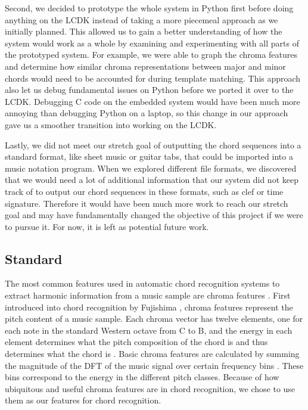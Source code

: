\documentclass[journal]{IEEEtran}
\begin{document}
Second, we decided to prototype the whole system in Python first before doing anything on the LCDK instead of taking a more piecemeal approach as we initially planned.
This allowed us to gain a better understanding of how the system would work as a whole by examining and experimenting with all parts of the prototyped system.
For example, we were able to graph the chroma features and determine how similar chroma representations between major and minor chords would need to be accounted for during template matching.
This approach also let us debug fundamental issues on Python before we ported it over to the LCDK.
Debugging C code on the embedded system would have been much more annoying than debugging Python on a laptop, so this change in our approach gave us a smoother transition into working on the LCDK.

Lastly, we did not meet our stretch goal of outputting the chord sequences into a standard format, like sheet music or guitar tabs, that could be imported into a music notation program.
When we explored different file formats, we discovered that we would need a lot of additional information that our system did not keep track of to output our chord sequences in these formats, such as clef or time signature.
Therefore it would have been much more work to reach our stretch goal and may have fundamentally changed the objective of this project if we were to pursue it.
For now, it is left as potential future work.


\subsection{Standard}
The most common features used in automatic chord recognition systems to extract harmonic information from a music sample are chroma features \cite{cho_chroma}.
First introduced into chord recognition by Fujishima \cite{fujishima}, chroma features represent the pitch content of a music sample.
Each chroma vector has twelve elements, one for each note in the standard Western octave from C to B, and the energy in each element determines what the pitch composition of the chord is and thus determines what the chord is \cite{jiang}.
Basic chroma features are calculated by summing the magnitude of the DFT of the music signal over certain frequency bins \cite{fujishima}.
These bins correspond to the energy in the different pitch classes.
Because of how ubiquitous and useful chroma features are in chord recognition, we chose to use them as our features for chord recognition.
\end{document}
